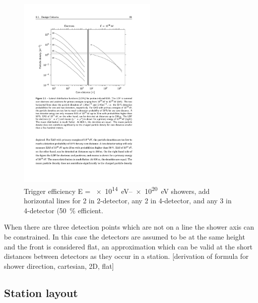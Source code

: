 \begin{figure}
    \centering
    \includegraphics[width=0.6\textwidth]
                    {plots/experiment/ldf_energies}
    \caption{Trigger efficiency E = \SIrange{e14}{e20}{\eV} showers, add horizontal lines for 2 in 2-detector, any 2 in 4-detector, and any 3 in 4-detector (\SI{50}{\percent} efficient.}
    \label{fig:ldf_energies2}
\end{figure}

When there are three detection points which are not on a line the shower axis can be constrained. In this case the detectors are assumed to be at the same height and the front is considered flat, an approximation which can be valid at the short distances between detectors as they occur in a station.
%
[derivation of formula for shower direction, cartesian, 2D, flat]


\subsection{Station layout}
\label{ssec:station_layout}

